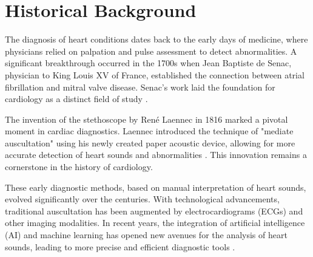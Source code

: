 \section{Historical Background} \label{background}
The diagnosis of heart conditions dates back to the early days of medicine, where physicians relied on palpation and pulse assessment to detect abnormalities. A significant breakthrough occurred in the 1700s when Jean Baptiste de Senac, physician to King Louis XV of France, established the connection between atrial fibrillation and mitral valve disease. Senac's work laid the foundation for cardiology as a distinct field of study \cite{mcmichael_history_1982}.

The invention of the stethoscope by René Laennec in 1816 marked a pivotal moment in cardiac diagnostics. Laennec introduced the technique of "mediate auscultation" using his newly created paper acoustic device, allowing for more accurate detection of heart sounds and abnormalities \cite{laennec_treatise_nodate}. This innovation remains a cornerstone in the history of cardiology.

These early diagnostic methods, based on manual interpretation of heart sounds, evolved significantly over the centuries. With technological advancements, traditional auscultation has been augmented by electrocardiograms (ECGs) and other imaging modalities. In recent years, the integration of artificial intelligence (AI) and machine learning has opened new avenues for the analysis of heart sounds, leading to more precise and efficient diagnostic tools \cite{esbin_overcoming_2020, huang_fusion_2020}.